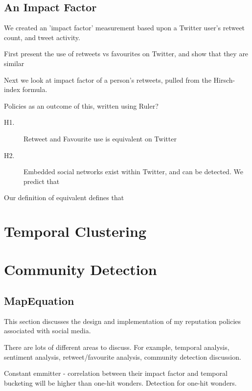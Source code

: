 
\subsection{An Impact Factor}

We created an 'impact factor' measurement based upon a Twitter user's retweet count, and tweet activity. 

First present the use of retweets vs favourites on Twitter, and show that they are similar

Next we look at impact factor of a person's retweets, pulled from the Hirsch-index formula. 

Policies as an outcome of this, written using Ruler?

\begin{description}
 \item [H1.]{Retweet and Favourite use is equivalent on Twitter}
 \item [H2.]{Embedded social networks exist within Twitter, and can be detected. We predict that }
\end{description}

Our definition of equivalent defines that 

\section{Temporal Clustering}

\section{Community Detection}

\subsection{MapEquation}

This section discusses the design and implementation of my reputation policies associated with social media. 

There are lots of different areas to discuss. For example, temporal analysis, sentiment analysis, retweet/favourite analysis, community detection discussion. 

Constant emmitter - correlation between their impact factor and temporal bucketing will be higher than one-hit wonders. Detection for one-hit wonders. 


